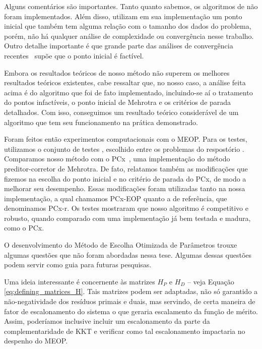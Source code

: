 Alguns  comentários são importantes. Tanto quanto sabemos, os algoritmos de \textcite{Zhang:1996it,Zhang:2006ic,Wright:1996kj} não foram implementados. Além disso, \textcite{Gertz:2003ji} utilizam em sua implementação um ponto inicial que também tem alguma relação com o tamanho dos dados do problema, porém, não há qualquer análise de complexidade ou convergência nesse trabalho. Outro detalhe importante é que  grande parte das análises de convergência recentes~\cite{Gondzio:2011ta} supõe que o ponto inicial é factível. 

Embora os resultados teóricos de nosso método  não superem os melhores resultados teóricos existentes, cabe ressaltar que, no nosso caso, a análise feita acima é do algoritmo que foi de fato implementado, incluindo-se aí o tratamento do pontos infactíveis, o ponto inicial de Mehrotra e os critérios de parada detalhados. Com isso, conseguimos um resultado teórico considerável de um algoritmo que tem seu funcionamento na prática demonstrado.



Foram feitos então experimentos computacionais com o MEOP.  Para os testes, utilizamos o conjunto de testes , escolhido entre os problemas do respostório \Netlib. Comparamos nosso método com o PCx~\cite{Czyzyk:1999hk}, uma implementação do método preditor-corretor de Mehrotra. De fato, relatamos também as modificações que fizemos na escolha do ponto inicial e no critério de parada do PCx, de modo a melhorar seu desempenho. Essas modificações foram utilizadas tanto na nossa implementação, a qual chamamos PCx-EOP quanto a de referência, que denominamos PCx-r. Os testes mostraram que nosso algoritmo é competitivo e robusto, quando comparado com uma implementação já bem testada e madura, como o PCx. 





O desenvolvimento do Método de Escolha Otimizada de Parâmetros trouxe algumas questões que 
não foram  abordadas nessa tese. Algumas dessas questões podem servir como guia para futuras pesquisas.

Uma ideia interessante é concernente às matrizes $H_P$ e $H_D$  -- veja Equação
\eqref{eq:defining_matrices_H}. Tais matrizes podem ser adaptadas, não só garantido a
não-negatividade dos resíduos primais e duais, mas servindo, de certa maneira  de  fator de escalonamento do sistema o que geraria escalamento da função de mérito. Assim, poderíamos inclusive incluir um escalonamento da parte da complementaridade de KKT e verificar como tal escalonamento impactaria no despenho do MEOP.


